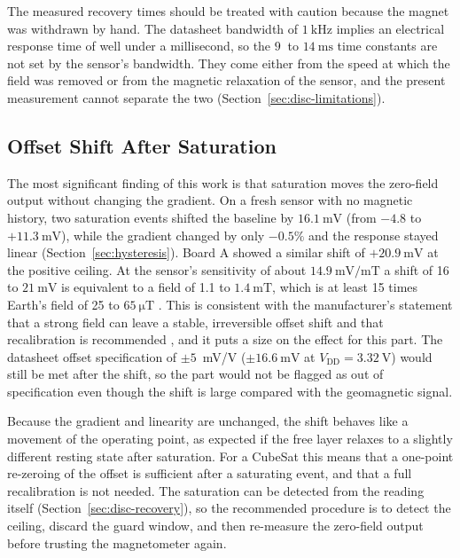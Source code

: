 \documentclass[12pt,a4paper]{article}
\begin{document}
The measured recovery times should be treated with caution because the magnet was withdrawn by hand. The datasheet bandwidth of $\SI{1}{\kilo\hertz}$ \cite{digikey_ct100} implies an electrical response time of well under a millisecond, so the $\SI{9}{}$ to $\SI{14}{\milli\second}$ time constants are not set by the sensor's bandwidth. They come either from the speed at which the field was removed or from the magnetic relaxation of the sensor, and the present measurement cannot separate the two (Section~\ref{sec:disc-limitations}).

\subsection{Offset Shift After Saturation}
\label{sec:disc-hysteresis}

The most significant finding of this work is that saturation moves the zero-field output without changing the gradient. On a fresh sensor with no magnetic history, two saturation events shifted the baseline by $\SI{16.1}{\milli\volt}$ (from $-4.8$ to $+\SI{11.3}{\milli\volt}$), while the gradient changed by only $-0.5\%$ and the response stayed linear (Section~\ref{sec:hysteresis}). Board A showed a similar shift of $+\SI{20.9}{\milli\volt}$ at the positive ceiling. At the sensor's sensitivity of about $\SI{14.9}{\milli\volt\per\milli\tesla}$ a shift of 16 to $\SI{21}{\milli\volt}$ is equivalent to a field of 1.1 to $\SI{1.4}{\milli\tesla}$, which is at least 15 times Earth's field of 25 to $\SI{65}{\micro\tesla}$ \cite{wmm}. This is consistent with the manufacturer's statement that a strong field can leave a stable, irreversible offset shift and that recalibration is recommended \cite{allegro_an133}, and it puts a size on the effect for this part. The datasheet offset specification of $\pm 5$~mV/V ($\pm\SI{16.6}{\milli\volt}$ at $V_{\text{DD}} = \SI{3.32}{\volt}$) \cite{ct100_datasheet} would still be met after the shift, so the part would not be flagged as out of specification even though the shift is large compared with the geomagnetic signal.

Because the gradient and linearity are unchanged, the shift behaves like a movement of the operating point, as expected if the free layer relaxes to a slightly different resting state after saturation. For a CubeSat this means that a one-point re-zeroing of the offset is sufficient after a saturating event, and that a full recalibration is not needed. The saturation can be detected from the reading itself (Section~\ref{sec:disc-recovery}), so the recommended procedure is to detect the ceiling, discard the guard window, and then re-measure the zero-field output before trusting the magnetometer again.
\end{document}
